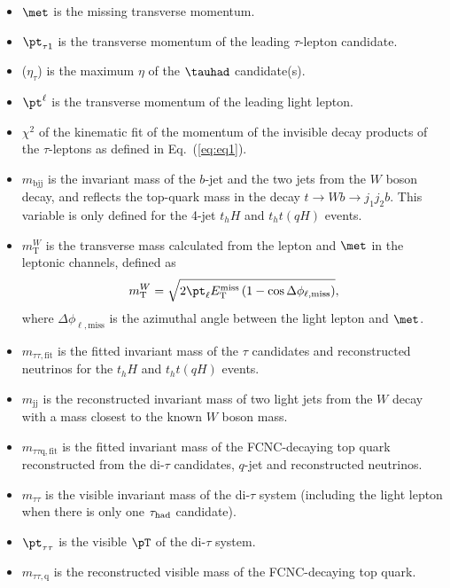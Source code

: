 \begin{itemize}
\item $\met$ is the missing transverse momentum.
\item ${\pt}_{\tau1} $ is the transverse momentum of the leading $\tau$-lepton candidate.
\item {}($\eta_{\tau}$) is the maximum $\eta$ of the $\tauhad$ candidate(s). 
\item ${\pt}^{\ell}$ is the transverse momentum of the leading light lepton.
\item $\chi^2$ of the kinematic fit of the momentum of the invisible decay products of the $\tau$-leptons as defined in Eq.~(\ref{eq:eq1}).
\item $m_{\text{bjj}}$ is the invariant mass of the $b$-jet and the two jets from the $W$ boson decay, and reflects the top-quark mass in the decay $t\to Wb \to j_1j_2b$. This variable is only defined for the 4-jet $t_hH$ and $t_ht(qH)$ events.
\item $m^{W}_{\text{T}}$ is the transverse mass calculated from the lepton and $\met$ in the leptonic channels, defined as
\begin{equation*}
m^{W}_{\text{T}} = \sqrt{2 {\pt}_{\ell} E_{\text{T}}^{\text{miss}} \left(1-\cos\Delta\phi_{\ell,\text{miss}} \right)},  
\end{equation*}
where $\Delta\phi_{\ell,\text{miss}}$ is the azimuthal angle between the light lepton and $\met$.  
\item $m_{\tau\tau,\text{fit}}$ is the fitted invariant mass of the $\tau$ candidates and reconstructed neutrinos for the $t_hH$ and $t_ht(qH)$ events. 
\item $m_{\text{jj}}$ is the reconstructed invariant mass of two light jets from the $W$ decay with a mass closest to the known $W$ boson mass.
\item $m_{\tau\tau\text{q},\text{fit}}$ is the fitted invariant mass of the FCNC-decaying top quark reconstructed from the di-$\tau$ candidates, $q$-jet and reconstructed neutrinos.
\item $m_{\tau\tau}$ is the visible invariant mass of the di-$\tau$ system (including the light lepton when there is only one $\tau_{\mathrm{had}}$ candidate).
\item ${\pt}_{\tau\tau}$ is the visible $\pT$ of the di-$\tau$ system.
\item $m_{\tau\tau,\text{q}}$ is the reconstructed visible mass of the FCNC-decaying top quark.

\end{itemize}
